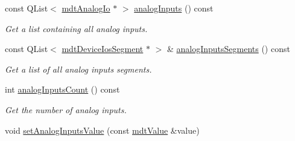 \begin{DoxyCompactItemize}
const QList$<$ \hyperlink{classmdt_analog_io}{mdtAnalogIo} $\ast$ $>$ \hyperlink{classmdt_device_ios_aab70f76d2107f0a9324a9b9d4db21532}{analogInputs} () const 
\begin{DoxyCompactList}\small\item\em Get a list containing all analog inputs. \end{DoxyCompactList}\item 
\hypertarget{classmdt_device_ios_a71a1b9cdbc524e4d0094ab37575defc1}{
const QList$<$ \hyperlink{classmdt_device_ios_segment}{mdtDeviceIosSegment} $\ast$ $>$ \& \hyperlink{classmdt_device_ios_a71a1b9cdbc524e4d0094ab37575defc1}{analogInputsSegments} () const }
\label{classmdt_device_ios_a71a1b9cdbc524e4d0094ab37575defc1}

\begin{DoxyCompactList}\small\item\em Get a list of all analog inputs segments. \end{DoxyCompactList}\item 
\hypertarget{classmdt_device_ios_a904069e2e641c92291226ea2524eadb3}{
int \hyperlink{classmdt_device_ios_a904069e2e641c92291226ea2524eadb3}{analogInputsCount} () const }
\label{classmdt_device_ios_a904069e2e641c92291226ea2524eadb3}

\begin{DoxyCompactList}\small\item\em Get the number of analog inputs. \end{DoxyCompactList}\item 
\hypertarget{classmdt_device_ios_aeaa1a401ec975a67f87c62d4abae65ee}{
void \hyperlink{classmdt_device_ios_aeaa1a401ec975a67f87c62d4abae65ee}{setAnalogInputsValue} (const \hyperlink{classmdt_value}{mdtValue} \&value)}
\label{classmdt_device_ios_aeaa1a401ec975a67f87c62d4abae65ee}


\end{DoxyCompactItemize}

